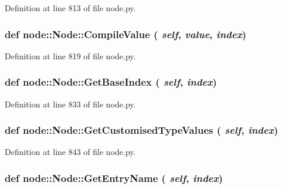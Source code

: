 Definition at line 813 of file node.py.\hypertarget{classnode_1_1Node_568c905bc501afe4b6e629aa1fb75422}{
\subsubsection[CompileValue]{\setlength{\rightskip}{0pt plus 5cm}def node::Node::Compile\-Value ( {\em self},  {\em value},  {\em index})}}
\label{classnode_1_1Node_568c905bc501afe4b6e629aa1fb75422}




Definition at line 819 of file node.py.\hypertarget{classnode_1_1Node_5d684b6a3fc90c5b0717dc3ade76e5ad}{
\subsubsection[GetBaseIndex]{\setlength{\rightskip}{0pt plus 5cm}def node::Node::Get\-Base\-Index ( {\em self},  {\em index})}}
\label{classnode_1_1Node_5d684b6a3fc90c5b0717dc3ade76e5ad}




Definition at line 833 of file node.py.\hypertarget{classnode_1_1Node_c21f753bedba1302086de038bf21fda8}{
\subsubsection[GetCustomisedTypeValues]{\setlength{\rightskip}{0pt plus 5cm}def node::Node::Get\-Customised\-Type\-Values ( {\em self},  {\em index})}}
\label{classnode_1_1Node_c21f753bedba1302086de038bf21fda8}




Definition at line 843 of file node.py.\hypertarget{classnode_1_1Node_9580efd7d474b782904670d7a5b9bb22}{
\subsubsection[GetEntryName]{\setlength{\rightskip}{0pt plus 5cm}def node::Node::Get\-Entry\-Name ( {\em self},  {\em index})}}
\label{classnode_1_1Node_9580efd7d474b782904670d7a5b9bb22}




